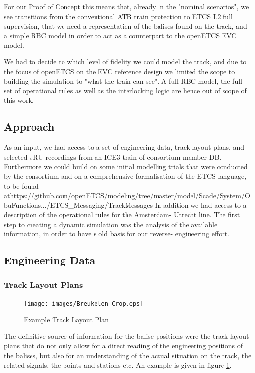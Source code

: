 \documentclass{template/openetcs_article}
\begin{document}
For our Proof of Concept this means that, already in the "nominal scenarios", we see transitions from the conventional ATB train protection to ETCS L2 full supervision, that we need a representation of the balises found on the track, and a simple RBC model in order to act as a counterpart to the openETCS EVC model.

We had to decide to which level of fidelity we could model the track, and due to the focus of openETCS on the EVC reference design we limited the scope to building the simulation to "what the train can see".\newline
A full RBC model, the full set of operational rules as well as the interlocking logic are hence out of scope of this work.\newline


\subsection{Approach}

As an input, we had access to a set of engineering data, track layout plans, and selected JRU recordings from an ICE3 train of consortium member DB. Furthermore we could build on some initial modelling trials that were conducted by the consortium and on a comprehensive formalisation of the ETCS language, to be found at\newline https://github.com/openETCS/modeling/tree/master/model/Scade/System/ObuFunctions\newline .../ETCS\_Messaging/TrackMessages\newline
In addition we had access to a description of the operational rules for the Amsterdam- Utrecht line.
The first step to creating a dynamic simulation was the analysis of the available information, in order to have s old basis for our reverse- engineering effort.
\subsection{Engineering Data}
\subsubsection{Track Layout Plans}

\begin{figure}
  \centering
  \texttt{[image: images/Breukelen\_Crop.eps]}
  \caption{Example Track Layout Plan}
  \label{fig:breukelen}
\end{figure}

The definitive source of information for the balise positions were the track layout plans that do not only allow for a direct reading of the engineering positions of the balises, but also for an understanding of the actual situation on the track, the related signals, the points and stations etc. An example is given in figure \ref{fig:breukelen}.\newline
\end{document}
